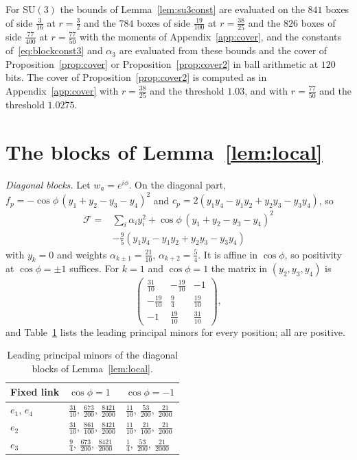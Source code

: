 \documentclass[11pt]{amsart}
\theoremstyle{definition}
\theoremstyle{remark}
\numberwithin{equation}{section}
\newcommand{\SU}{\mathrm{SU}}
\begin{document}
For $\SU(3)$ the bounds of Lemma~\ref{lem:su3const} are evaluated on the
$841$ boxes of side $\frac3{16}$ at $r=\frac32$ and the $784$ boxes of side
$\frac{19}{100}$ at $r=\frac{38}{25}$ and the $826$ boxes of side
$\frac{77}{400}$ at $r=\frac{77}{50}$ with the moments of
Appendix~\ref{app:cover}, and the constants of~\eqref{eq:blockconst3} and
$\alpha_3$ are evaluated from these bounds and the cover of
Proposition~\ref{prop:cover} or Proposition~\ref{prop:cover2} in ball
arithmetic at $120$ bits. The cover of Proposition~\ref{prop:cover2} is
computed as in Appendix~\ref{app:cover} with $r=\frac{38}{25}$ and the
threshold $1.03$, and with $r=\frac{77}{50}$ and the threshold $1.0275$.

\section{The blocks of Lemma~\ref{lem:local}}\label{app:blocks}

\emph{Diagonal blocks.} Let $w_a=e^{i\phi}$. On the diagonal part,
$f_p=-\cos\phi\,(y_1+y_2-y_3-y_4)^2$ and $c_p=2(y_1y_4-y_1y_2+y_2y_3-y_3y_4)$, so
\[
\begin{split}
\mathcal F={}&\sum_i\alpha_iy_i^2+\cos\phi\,(y_1+y_2-y_3-y_4)^2\\
&-\tfrac95(y_1y_4-y_1y_2+y_2y_3-y_3y_4)
\end{split}
\]
with $y_k=0$ and weights $\alpha_{k\pm1}=\frac{21}{10}$, $\alpha_{k+2}=\frac54$.
It is affine in $\cos\phi$, so positivity at $\cos\phi=\pm1$ suffices. For
$k=1$ and $\cos\phi=1$ the matrix in $(y_2,y_3,y_4)$ is
\[
\begin{pmatrix}\frac{31}{10}&-\frac{19}{10}&-1\\[2pt]-\frac{19}{10}&\frac94&
\frac{19}{10}\\[2pt]-1&\frac{19}{10}&\frac{31}{10}\end{pmatrix},
\]
and Table~\ref{tab:minors} lists the leading principal minors for every
position; all are positive.

\begin{table}[h]
\caption{Leading principal minors of the diagonal blocks of
Lemma~\ref{lem:local}.}
\label{tab:minors}
\begin{tabular}{lll}
\toprule
Fixed link&$\cos\phi=1$&$\cos\phi=-1$\\
\midrule
$e_1$, $e_4$&$\frac{31}{10},\ \frac{673}{200},\ \frac{8421}{2000}$&
$\frac{11}{10},\ \frac{53}{200},\ \frac{21}{2000}$\\[2pt]
$e_2$&$\frac{31}{10},\ \frac{861}{100},\ \frac{8421}{2000}$&
$\frac{11}{10},\ \frac{21}{100},\ \frac{21}{2000}$\\[2pt]
$e_3$&$\frac94,\ \frac{673}{200},\ \frac{8421}{2000}$&
$\frac14,\ \frac{53}{200},\ \frac{21}{2000}$\\
\bottomrule
\end{tabular}
\end{table}
\end{document}
